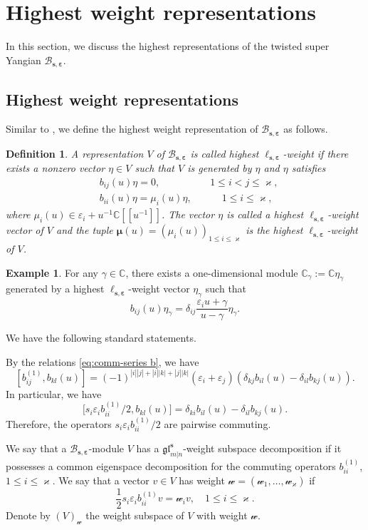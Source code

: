 \documentclass[11pt,reqno]{amsart}
\numberwithin{equation}{section}
\newtheorem{dfn}[thm]{Definition}
\theoremstyle{definition}
\newtheorem{eg}[thm]{Example}
\theoremstyle{remark}
\newcommand{\beq}{\begin{equation}}
\newcommand{\eeq}{\end{equation}}
\newcommand{\C}{\mathbb{C}}
\newcommand{\mc}{\mathcal}
\newcommand{\bC}{\mathbb{C}}
\newcommand{\lle}{\leqslant}
\newcommand{\glMN}{\mathfrak{gl}_{m|n}^{\bm s}}
\newcommand{\BMN}{{\mathscr{B}_{\bm s,\bm \ve}}}
\newcommand{\ka}{\varkappa}
\newcommand{\ve}{\varepsilon}
\newcommand{\qedd}{\tag*{$\square$}}
\newcommand{\s}{{\bm s}}
\begin{document}
\section{Highest weight representations}\label{sec:reps}
In this section, we discuss the highest representations of the twisted super Yangian $\BMN$.
\subsection{Highest weight representations}
Similar to \cite{Molev2002reflection}, we define the highest weight representation of $\BMN$ as follows.
\begin{dfn}
A representation $V$ of $\BMN$ is called highest $\ell_{\s,\bm\ve}$-weight if there exists a nonzero vector $\eta\in V$ such that $V$ is generated by $\eta$ and $\eta$ satisfies
\beq\label{eq:highest-B}
\begin{split}
   & b_{ij}(u)\eta=0,  \qquad \quad\quad \quad 1\lle i<j\lle \ka,\\
   &    b_{ii}(u)\eta=\mu_i(u)\eta,\qquad\quad  1\lle i\lle \ka,
\end{split}
\eeq
where $\mu_i(u)\in \ve_i+u^{-1}\C[[u^{-1}]]$. The vector $\eta$ is called a {\it highest $\ell_{\s,\bm\ve}$-weight vector} of $V$ and the tuple $\bm \mu(u)=(\mu_i(u))_{1\lle i\lle \ka}$ is the {\it highest $\ell_{\s,\bm\ve}$-weight} of $V$.
\end{dfn}

\begin{eg}\label{eg:1-dim}
For any $\gamma\in\bC$, there exists a one-dimensional module $\bC_{\gamma}:=\bC \eta_{\gamma}$ generated by a highest $\ell_{\s,\bm\ve}$-weight vector $\eta_{\gamma}$  such that
\[
b_{ij}(u)\eta_\gamma = \delta_{ij}\frac{\ve_iu+\gamma}{u-\gamma}\eta_\gamma.\qedd
\]
\end{eg}

We have the following standard statements.

By the relations \eqref{eq:comm-series b}, we have
\[
[b_{ij}^{(1)},b_{kl}(u)]=(-1)^{|i||j|+|i||k|+|j||k|}(\ve_i+\ve_j)(\delta_{kj}b_{il}(u)-\delta_{il}b_{kj}(u)).
\]
In particular, we have
\beq\label{eq:bii-weightb}
\big[s_i\ve_ib_{ii}^{(1)}/2,b_{kl}(u)\big]=\delta_{ki}b_{il}(u)-\delta_{il}b_{kj}(u).
\eeq
Therefore, the operators $s_i\ve_ib_{ii}^{(1)}/2$ are pairwise commuting.

We say that a $\BMN$-module $V$ has a $\glMN$-weight subspace decomposition if it possesses a common eigenspace decomposition for the commuting operators $b_{ii}^{(1)}$, $1\lle i\lle \ka$. We say that a vector $v\in V$ has weight $\mc w=(\mc w_1,\dots,\mc w_\ka)$ if
\[
\frac{1}{2}s_i\ve_i b_{ii}^{(1)}v=\mc w_i v,\quad 1\lle i\lle \ka.
\]
Denote by $(V)_{\mc w}$ the weight subspace of $V$ with weight $\mc w$.
\end{document}
